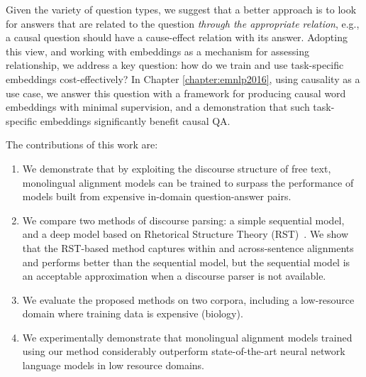 Given the variety of question types, we suggest that a better approach is to look for answers that are related to the question \emph{through the appropriate relation}, e.g., a causal question should have a cause-effect relation with its answer.
Adopting this view, and working with embeddings as a mechanism for assessing relationship, we address a key question: how do we train and use task-specific embeddings cost-effectively? 
In Chapter \ref{chapter:emnlp2016}, using causality as a use case, we answer this question with a framework for producing causal word embeddings with minimal supervision, and a demonstration that such task-specific embeddings significantly benefit causal QA. 

The contributions of this work are:
\begin{enumerate}

\item We demonstrate that by exploiting the discourse structure of free text, monolingual alignment models can be trained to surpass the performance of models built from expensive in-domain question-answer pairs. 

\item We compare two methods of discourse parsing: a simple sequential model, and a deep model based on Rhetorical Structure Theory (RST)~\cite{mann88}.  We show that the RST-based method captures within and across-sentence alignments and performs better than the sequential model, but the sequential model is an acceptable approximation when a discourse parser is not available.  

\item We evaluate the proposed methods on two corpora, including a low-resource domain where training data is expensive (biology).

\item We experimentally demonstrate that monolingual alignment models trained using our method considerably outperform state-of-the-art neural network language models in low resource domains.
\end{enumerate}

